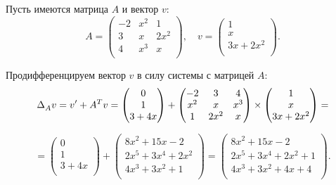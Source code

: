 \begin{example}
	Пусть имеются матрица $A$ и вектор $v$:
	\begin{equation*}
		A = 
		\begin{pmatrix}
			-2 & x^2 & 1 \\
			3 & x & 2x^2 \\
			4 & x^3 & x \\
		\end{pmatrix},\quad
		v =
		\begin{pmatrix}
			1 \\
			x \\
			3x + 2x^2 \\
		\end{pmatrix}.
	\end{equation*}
    
	Продифференцируем вектор $v$ в силу системы с матрицей $A$:
	\begin{equation*}
		\text{$ \Delta_A^{} v $} = v' + A^T v = 
		\begin{pmatrix}
			0 \\
			1 \\
			3 + 4x \\
		\end{pmatrix}
        +
        \begin{pmatrix}
			-2 & 3 & 4 \\
			x^2 & x & x^3 \\
			1 & 2x^2 & x \\
		\end{pmatrix}
        \times
        \begin{pmatrix}
			1 \\
			x \\
			3x + 2x^2 \\
		\end{pmatrix}
        =
    \end{equation*}
    
    \begin{equation*}
        =
        \begin{pmatrix}
			0 \\
			1 \\
			3 + 4x \\
		\end{pmatrix}
        +
		\begin{pmatrix}
			8x^2 + 15x - 2 \\
			2x^5 + 3x^4 + 2x^2 \\
			4x^3 + 3x^2  + 1 \\
		\end{pmatrix} =
		\begin{pmatrix}
			8x^2 + 15x - 2 \\
			2x^5 + 3x^4 + 2x^2 + 1\\
			4x^3 + 3x^2 + 4x + 4 \\
		\end{pmatrix}.
	\end{equation*}
\end{example}
\bigskip

